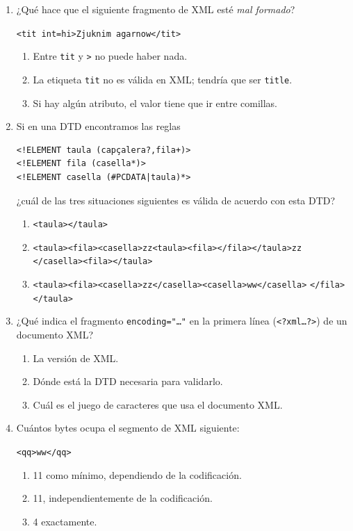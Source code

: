 \begin{enumerate}
\item ¿Qué hace que el siguiente fragmento de XML esté \emph{mal formado}? \begin{center}\verb|<tit int=hi>Zjuknim agarnow</tit>|\end{center} \begin{enumerate} \item Entre \verb|tit| y \verb|>| no puede haber nada. \item La etiqueta \verb|tit| no es válida en XML; tendría que ser \verb|title|. \item Si hay algún atributo, el valor tiene que ir entre comillas. \end{enumerate} 

\item Si en una DTD encontramos las reglas 
\begin{verbatim} 
<!ELEMENT taula (capçalera?,fila+)> 
<!ELEMENT fila (casella*)> 
<!ELEMENT casella (#PCDATA|taula)*> 
\end{verbatim}
¿cuál de las tres situaciones siguientes es válida de acuerdo con esta DTD? \begin{enumerate} \item \verb|<taula></taula>| \item \verb|<taula><fila><casella>zz<taula><fila></fila></taula>zz| \verb|</casella><fila></taula>| \item \verb|<taula><fila><casella>zz</casella><casella>ww</casella>| \verb|</fila></taula>| \end{enumerate} 

\item ¿Qué indica el fragmento \texttt{encoding="\ldots"} en la primera línea (\texttt{<?xml\ldots?>}) de un documento XML? \begin{enumerate} \item La versión de XML. \item Dónde está la DTD necesaria para validarlo. \item Cuál es el juego de caracteres que usa el documento XML. \end{enumerate} 

\item Cuántos bytes ocupa el segmento de XML siguiente: \begin{center}\verb|<qq>ww</qq>|\end{center} \begin{enumerate} \item 11 como mínimo, dependiendo de la codificación. \item 11, independientemente de la codificación. \item 4 exactamente. \end{enumerate} 


\end{enumerate}
